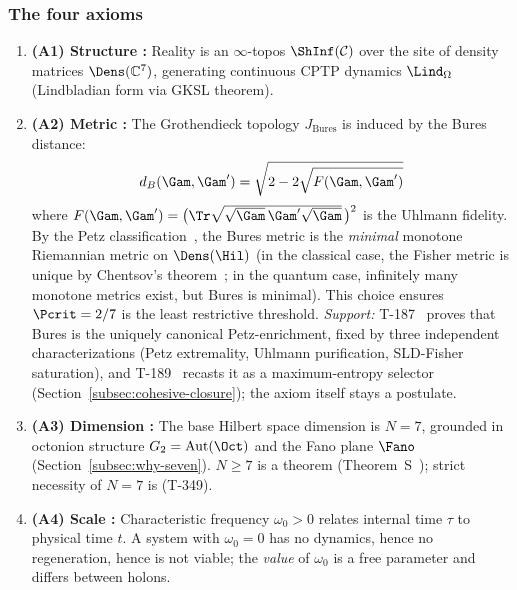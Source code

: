 \subsubsection*{The four axioms}

\begin{enumerate}[leftmargin=2em]
  \item \textbf{(A1) Structure :} Reality is an $\infty$-topos $\ShInf(\mathcal{C})$ over
        the site of density matrices $\Dens(\mathbb{C}^7)$, generating continuous CPTP
        dynamics $\Lind_\Omega$ (Lindbladian form via GKSL theorem).
  \item \textbf{(A2) Metric :} The Grothendieck topology $J_{\mathrm{Bures}}$ is induced
        by the Bures distance:
        \begin{equation}
          d_B(\Gam, \Gam') = \sqrt{2 - 2\sqrt{F(\Gam, \Gam')}}
          \label{eq:bures}
        \end{equation}
        where $F(\Gam, \Gam') = \bigl(\Tr\sqrt{\sqrt{\Gam}\,\Gam'\sqrt{\Gam}}\,\bigr)^2$
        is the Uhlmann fidelity. By the Petz classification~\cite{petz1996}, the Bures metric is the
        \emph{minimal} monotone Riemannian metric on $\Dens(\Hil)$
        (in the classical case, the Fisher metric is unique by
        Chentsov's theorem~\cite{chentsov1982}; in the quantum case,
        infinitely many monotone metrics exist, but Bures is minimal).
        This choice ensures $\Pcrit = 2/7$ is the least restrictive threshold.
        \emph{Support:} T-187~ proves that Bures is the uniquely canonical
        Petz-enrichment, fixed by three independent characterizations (Petz extremality,
        Uhlmann purification, SLD-Fisher saturation), and T-189~ recasts it as a
        maximum-entropy selector (Section~\ref{subsec:cohesive-closure}); the axiom
        itself stays a postulate.
  \item \textbf{(A3) Dimension :} The base Hilbert space dimension is $N = 7$, grounded
        in octonion structure $G_2 = \mathrm{Aut}(\Oct)$ and the Fano plane $\Fano$
        (Section~\ref{subsec:why-seven}). $N \geq 7$ is a theorem (Theorem~S~);
        strict necessity of $N = 7$ is  (T-349).
  \item \textbf{(A4) Scale :} Characteristic frequency
        $\omega_0 > 0$ relates internal time $\tau$ to physical time $t$. A system with
        $\omega_0 = 0$ has no dynamics, hence no regeneration, hence is not viable; the
        \emph{value} of $\omega_0$ is a free parameter and differs between holons.
\end{enumerate}

